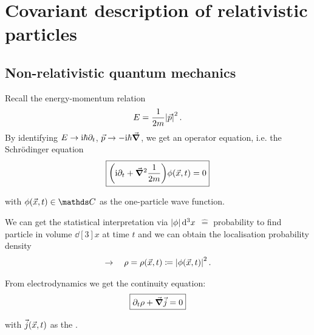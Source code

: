 \chapter{Covariant description of relativistic particles}
\section{Non-relativistic quantum mechanics}
Recall the energy-momentum relation
\begin{align}
    E = \frac{1}{2m} \qty|\vec p|^2\,.
\end{align}
By identifying $E \rightarrow \mathrm{i} \hbar \partial_t$, $\vec p \rightarrow -\mathrm{i} \hbar \vec \grad$, we get an operator equation, i.e. the Schrödinger equation
\begin{align}\label{eq:schroedinger}
    \boxed{\qty(\mathrm{i} \partial_t + \vec \grad ^2 \frac{1}{2m}) \phi \qty(\vec x, t) = 0}
\end{align}
\begin{compactitem}
    \item[with] $\phi \qty(\vec x, t) \in \mb C$ as the one-particle wave function.
\end{compactitem}
We can get the statistical interpretation via $\qty | \phi | \dd[3]{x}$ $\hat =$ probability to find particle in volume $\dd[3]{x}$ at time $t$ and we can obtain the localisation probability density
\begin{align}
    \rightarrow \quad \rho = \rho \qty (\vec x, t) \coloneqq \qty|\phi \qty(\vec x, t)|^2\,.
\end{align}
\begin{multicols}{2}
    \begin{center}
    \end{center}
    From electrodynamics we get the continuity equation:
    \begin{align}\label{eq:continuity}
        \boxed{\partial_t \rho + \vec \grad \vec j = 0}
    \end{align}
    \begin{compactitem}
        \item[with] $\vec j \qty(\vec x, t)$ as the .
    \end{compactitem}
\end{multicols}
